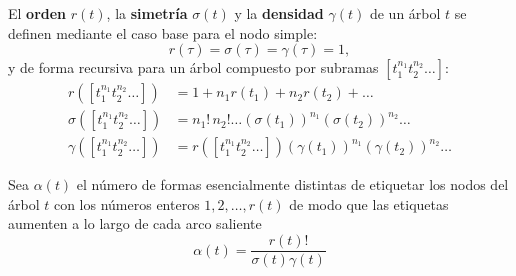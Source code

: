 \begin{defi} El \textbf{orden} $r(t)$, la \textbf{simetría} $\sigma(t)$ y la \textbf{densidad} $\gamma(t)$ de un árbol $t$ se definen mediante el caso base para el nodo simple:
\begin{equation*}
    r(\tau) = \sigma(\tau) = \gamma(\tau) = 1,
\end{equation*}
y de forma recursiva para un árbol compuesto por subramas $[t_1^{n_1} t_2^{n_2} \dots]$:
\begin{align*}
    r([t_1^{n_1} t_2^{n_2} \dots]) &= 1 + n_1 r(t_1) + n_2 r(t_2) + \dots \\
    \sigma([t_1^{n_1} t_2^{n_2} \dots]) &= n_1! \, n_2! \dots (\sigma(t_1))^{n_1} (\sigma(t_2))^{n_2} \dots \\
    \gamma([t_1^{n_1} t_2^{n_2} \dots]) &= r([t_1^{n_1} t_2^{n_2} \dots]) (\gamma(t_1))^{n_1} (\gamma(t_2))^{n_2} \dots
\end{align*}

Sea $\alpha(t)$ el número de formas esencialmente distintas de etiquetar los nodos del árbol $t$ con los números enteros $1, 2, \dots, r(t)$ de modo que las etiquetas aumenten a lo largo de cada arco saliente
\begin{equation*}
    \alpha(t) = \frac{r(t)!}{\sigma(t) \gamma(t)}
\end{equation*}
\end{defi}
